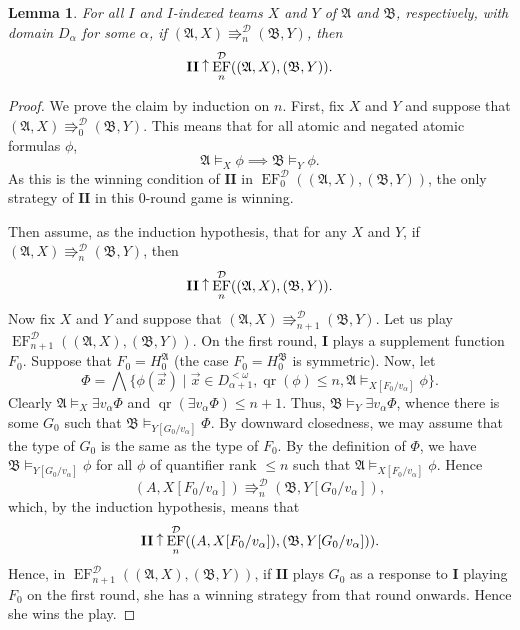 \documentclass[10pt,a4paper]{amsart}
\newtheorem{lemma}[definition]{Lemma}
\newcommand{\wins}{\mathbin{\raisebox{0.8\depth}{$\uparrow$}}}
\newcommand{\playerone}{\mathrm{\mathbf{I}}}
\newcommand{\playertwo}{\mathrm{\mathbf{II}}}
\DeclareMathOperator{\EF}{EF}
\newcommand{\A}{\mathfrak{A}}
\newcommand{\B}{\mathfrak{B}}
\DeclareMathOperator{\qr}{qr}
\newcommand{\posEquiv}{\mathbin{\Rrightarrow}}
\newcommand{\deplog}{\mathcal D}
\begin{document}
\begin{lemma}\label{lemma: from logic to auxiliary game}
    For all $I$ and $I$-indexed teams $X$ and $Y$ of $\A$ and $\B$, respectively, with domain $D_\alpha$ for some $\alpha$, if $(\A,X)\posEquiv^\deplog_n(\B,Y)$, then
    \[
        \playertwo\wins\EF^\deplog_n((\A,X),(\B,Y)).
    \]
\end{lemma}
\begin{proof}
    We prove the claim by induction on $n$. First, fix $X$ and $Y$ and suppose that $(\A,X)\posEquiv^\deplog_0(\B,Y)$. This means that for all atomic and negated atomic formulas $\phi$,
    \[
        \A\models_X\phi \implies \B\models_Y\phi.
    \]
    As this is the winning condition of $\playertwo$ in $\EF^\deplog_0((\A,X),(\B,Y))$, the only strategy of $\playertwo$ in this $0$-round game is winning.

    Then assume, as the induction hypothesis, that for any $X$ and $Y$, if $(\A,X)\posEquiv^\deplog_n(\B,Y)$, then
    \[
        \playertwo\wins\EF^\deplog_n((\A,X),(\B,Y)).
    \]
    Now fix $X$ and $Y$ and suppose that $(\A,X)\posEquiv^\deplog_{n+1}(\B,Y)$. Let us play $\EF^\deplog_{n+1}((\A,X),(\B,Y))$. On the first round, $\playerone$ plays a supplement function $F_0$. Suppose that $F_0 = H^\A_0$ (the case $F_0 = H^\B_0$ is symmetric). Now, let
    \[
        \Phi = \bigwedge\{\phi(\vec x) \mid \vec x\in D_{\alpha+1}^{<\omega}, \qr(\phi)\leq n, \A\models_{X[F_0/v_\alpha]}\phi \}.
    \]
    Clearly $\A\models_X\exists v_\alpha\Phi$ and $\qr(\exists v_\alpha\Phi) \leq n+1$. Thus, $\B\models_Y\exists v_\alpha\Phi$, whence there is some $G_0$ such that $\B\models_{Y[G_0/v_\alpha]}\Phi$. By downward closedness, we may assume that the type of $G_0$ is the same as the type of $F_0$. By the definition of $\Phi$, we have $\B\models_{Y[G_0/v_\alpha]}\phi$ for all $\phi$ of quantifier rank $\leq n$ such that $\A\models_{X[F_0/v_\alpha]}\phi$. Hence
    \[
        (A,X[F_0/v_\alpha]) \posEquiv^\deplog_n (\B,Y[G_0/v_\alpha]),
    \]
    which, by the induction hypothesis, means that
    \[
        \playertwo\wins\EF^\deplog_n((A,X[F_0/v_\alpha]),(\B,Y[G_0/v_\alpha])).
    \]
    Hence, in $\EF^\deplog_{n+1}((\A,X),(\B,Y))$, if $\playertwo$ plays $G_0$ as a response to $\playerone$ playing $F_0$ on the first round, she has a winning strategy from that round onwards. Hence she wins the play.
\end{proof}
\end{document}
